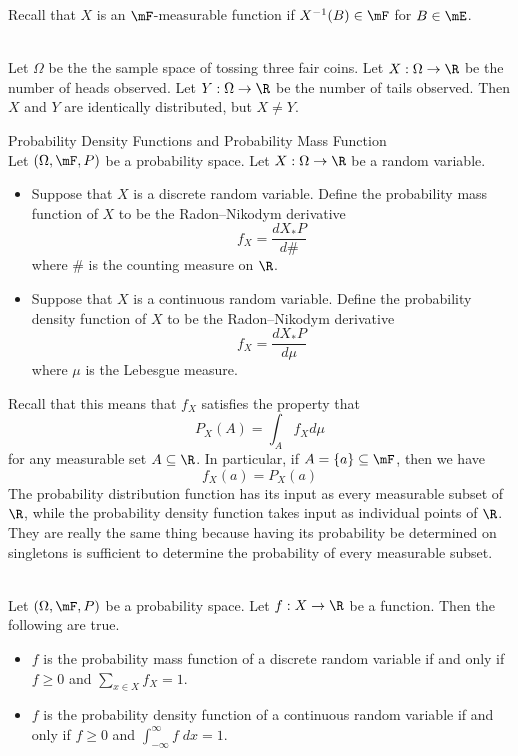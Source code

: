 \documentclass[a4paper]{article}
\begin{document}
Recall that $X$ is an $\mF$-measurable function if $X^{-1}(B)\in\mF$ for $B\in\mE$. 

\begin{eg}{}{}\\
Let $\Omega$ be the the sample space of tossing three fair coins. Let $X:\Omega\to\R$ be the number of heads observed. Let $Y:\Omega\to\R$ be the number of tails observed. Then $X$ and $Y$ are identically distributed, but $X\neq Y$. 
\end{eg}

\begin{defn}{Probability Density Functions and Probability Mass Function}{}\\
Let $(\Omega,\mF,P)$ be a probability space. Let $X:\Omega\to\R$ be a random variable. 
\begin{itemize}
\item Suppose that $X$ is a discrete random variable. Define the probability mass function of $X$ to be the Radon–Nikodym derivative $$f_X=\frac{d X_\ast P}{d\#}$$ where $\#$ is the counting measure on $\R$. 
\item Suppose that $X$ is a continuous random variable. Define the probability density function of $X$ to be the Radon–Nikodym derivative $$f_X=\frac{d X_\ast P}{d\mu}$$ where $\mu$ is the Lebesgue measure. 
\end{itemize}
\end{defn}

Recall that this means that $f_X$ satisfies the property that $$P_X(A)=\int_A f_X d\mu$$ for any measurable set $A\subseteq\R$. In particular, if $A=\{a\}\subseteq\mF$, then we have $$f_X(a)=P_X(a)$$ The probability distribution function has its input as every measurable subset of $\R$, while the probability density function takes input as individual points of $\R$. They are really the same thing because having its probability be determined on singletons is sufficient to determine the probability of every measurable subset. 

\begin{prp}{}{}\\
Let $(\Omega,\mF,P)$ be a probability space. Let $f:X\to\R$ be a function. Then the following are true. 
\begin{itemize}
\item $f$ is the probability mass function of a discrete random variable if and only if $f\geq 0$ and $\sum_{x\in X}f_X=1$. 
\item $f$ is the probability density function of a continuous random variable if and only if $f\geq 0$ and $\int_{-\infty}^\infty f\;dx=1$. 
\end{itemize}
\end{prp}
\end{document}
